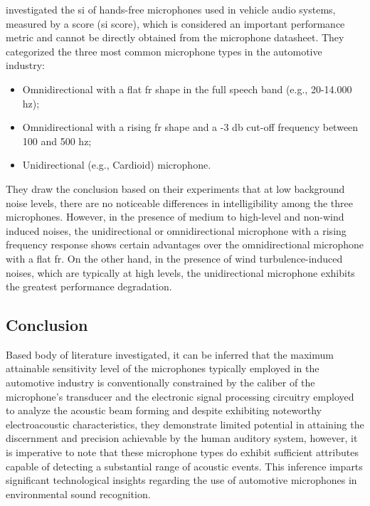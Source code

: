 \textcite{Du2022} investigated the \gls{si} of hands-free microphones used in vehicle audio systems, measured by a score (\gls{si} score), which is considered an important performance metric and cannot be directly obtained from the microphone datasheet. They categorized the three most common microphone types in the automotive industry:

\begin{itemize}
    \item Omnidirectional with a flat \gls{fr} shape in the full speech band (e.g., 20-14.000 \gls{hz});
    \item Omnidirectional with a rising \gls{fr} shape and a -3 \gls{db} cut-off frequency between 100 and 500 \gls{hz};
    \item Unidirectional (e.g., Cardioid) microphone.   
\end{itemize}

They draw the conclusion based on their experiments that at low background noise levels, there are no noticeable differences in intelligibility among the three microphones. However, in the presence of medium to high-level and non-wind induced noises, the unidirectional or omnidirectional microphone with a rising frequency response shows certain advantages over the omnidirectional microphone with a flat \gls{fr}. On the other hand, in the presence of wind turbulence-induced noises, which are typically at high levels, the unidirectional microphone exhibits the greatest performance degradation.


\subsection{Conclusion}
\label{subsec:microphones_conclusion}

Based body of literature investigated, it can be inferred that the maximum attainable sensitivity level of the microphones typically employed in the automotive industry is conventionally constrained by the caliber of the microphone's transducer and the electronic signal processing circuitry employed to analyze the acoustic beam forming and despite exhibiting noteworthy electroacoustic characteristics, they demonstrate limited potential in attaining the discernment and precision achievable by the human auditory system, however, it is imperative to note that these microphone types do exhibit sufficient attributes capable of detecting a substantial range of acoustic events. This inference imparts significant technological insights regarding the use of automotive microphones in environmental sound recognition.


